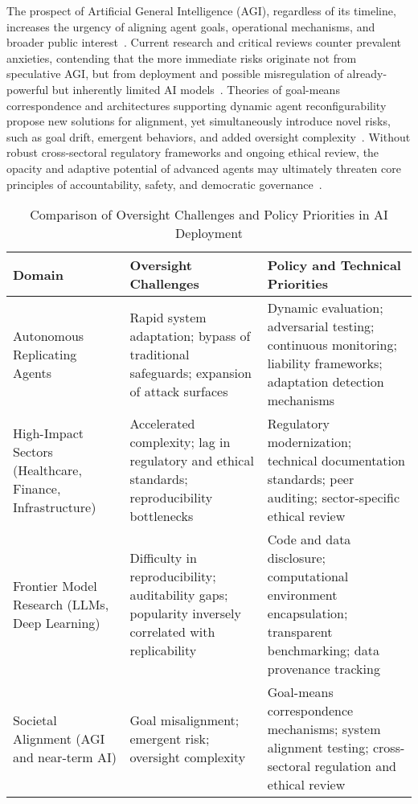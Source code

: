 \documentclass[sigconf]{acmart}
\begin{document}
The prospect of Artificial General Intelligence (AGI), regardless of its timeline, increases the urgency of aligning agent goals, operational mechanisms, and broader public interest~\cite{ref43,ref49,ref50,ref53}. Current research and critical reviews counter prevalent anxieties, contending that the more immediate risks originate not from speculative AGI, but from deployment and possible misregulation of already-powerful but inherently limited AI models~\cite{ref40,ref49,ref53}. Theories of goal-means correspondence and architectures supporting dynamic agent reconfigurability propose new solutions for alignment, yet simultaneously introduce novel risks, such as goal drift, emergent behaviors, and added oversight complexity~\cite{ref50,ref54}. Without robust cross-sectoral regulatory frameworks and ongoing ethical review, the opacity and adaptive potential of advanced agents may ultimately threaten core principles of accountability, safety, and democratic governance~\cite{ref52,ref53,ref54,ref55}.

\begin{table*}[htbp]
\centering
\caption{Comparison of Oversight Challenges and Policy Priorities in AI Deployment}
\label{tab:oversight_policy_comparison}
\begin{adjustbox}{max width=\textwidth}
\begin{tabular}{lll}
\toprule
\textbf{Domain} & \textbf{Oversight Challenges} & \textbf{Policy and Technical Priorities} \\
\midrule
Autonomous Replicating Agents & Rapid system adaptation; bypass of traditional safeguards; expansion of attack surfaces & Dynamic evaluation; adversarial testing; continuous monitoring; liability frameworks; adaptation detection mechanisms \\
High-Impact Sectors (Healthcare, Finance, Infrastructure) & Accelerated complexity; lag in regulatory and ethical standards; reproducibility bottlenecks & Regulatory modernization; technical documentation standards; peer auditing; sector-specific ethical review \\
Frontier Model Research (LLMs, Deep Learning) & Difficulty in reproducibility; auditability gaps; popularity inversely correlated with replicability & Code and data disclosure; computational environment encapsulation; transparent benchmarking; data provenance tracking \\
Societal Alignment (AGI and near-term AI) & Goal misalignment; emergent risk; oversight complexity & Goal-means correspondence mechanisms; system alignment testing; cross-sectoral regulation and ethical review  \\
\bottomrule
\end{tabular}
\end{adjustbox}
\end{table*}
\end{document}
